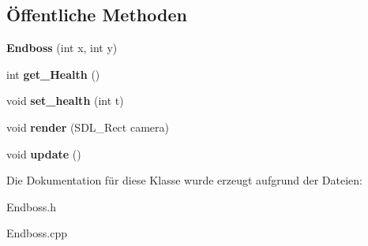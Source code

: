 \subsection*{Öffentliche Methoden}
\begin{DoxyCompactItemize}
\item 
\hypertarget{class_endboss_a6d553673da1e7b3d09ce54cd2503cbb7}{{\bfseries Endboss} (int x, int y)}\label{class_endboss_a6d553673da1e7b3d09ce54cd2503cbb7}

\item 
\hypertarget{class_endboss_a69ae2922f0f6647037926e917da4ee5e}{int {\bfseries get\-\_\-\-Health} ()}\label{class_endboss_a69ae2922f0f6647037926e917da4ee5e}

\item 
\hypertarget{class_endboss_a0bbf59647d911c6380246de92b5f5e21}{void {\bfseries set\-\_\-health} (int t)}\label{class_endboss_a0bbf59647d911c6380246de92b5f5e21}

\item 
\hypertarget{class_endboss_a17b150268f358172b140a984aaaa61c8}{void {\bfseries render} (S\-D\-L\-\_\-\-Rect camera)}\label{class_endboss_a17b150268f358172b140a984aaaa61c8}

\item 
\hypertarget{class_endboss_a7a56e4b087239ff73b7810c967e3858f}{void {\bfseries update} ()}\label{class_endboss_a7a56e4b087239ff73b7810c967e3858f}

\end{DoxyCompactItemize}


Die Dokumentation für diese Klasse wurde erzeugt aufgrund der Dateien\-:\begin{DoxyCompactItemize}
\item 
Endboss.\-h\item 
Endboss.\-cpp\end{DoxyCompactItemize}
